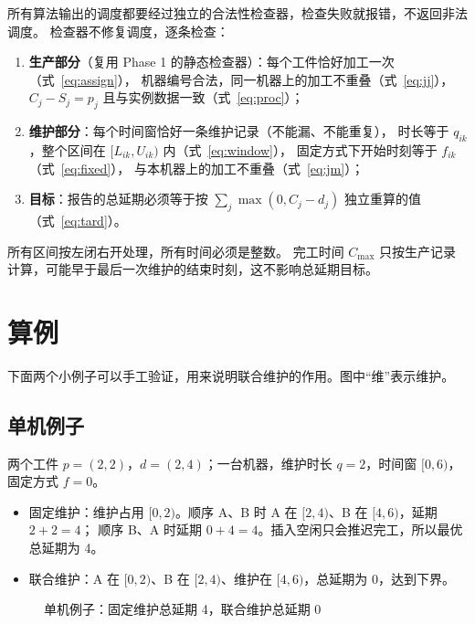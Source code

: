 \documentclass[11pt,oneside,notitlepage]{ctexrep}
\theoremstyle{definition}
\theoremstyle{remark}
\newcommand{\gbar}[5]{%
  \fill[#5] (#2,-#1-0.35) rectangle (#3,-#1+0.35);
  \draw (#2,-#1-0.35) rectangle (#3,-#1+0.35);
  \node[font=\small] at ({(#2+#3)/2},-#1) {#4};}
\newcommand{\gaxis}[2]{%
  \draw[->] (0,-#1-0.55) -- (#2+0.4,-#1-0.55);
  \foreach \t in {0,...,#2} {\draw (\t,-#1-0.55) -- (\t,-#1-0.65); \node[font=\scriptsize,below] at (\t,-#1-0.6) {\t};}}
\begin{document}
所有算法输出的调度都要经过独立的合法性检查器，检查失败就报错，不返回非法调度。
检查器不修复调度，逐条检查：
\begin{enumerate}[nosep]
  \item \textbf{生产部分}（复用 Phase 1 的静态检查器）：每个工件恰好加工一次（式~\eqref{eq:assign}），
        机器编号合法，同一机器上的加工不重叠（式~\eqref{eq:jj}），
        $C_j-S_j=p_j$ 且与实例数据一致（式~\eqref{eq:proc}）；
  \item \textbf{维护部分}：每个时间窗恰好一条维护记录（不能漏、不能重复），
        时长等于 $q_{ik}$，整个区间在 $[L_{ik},U_{ik})$ 内（式~\eqref{eq:window}），
        固定方式下开始时刻等于 $f_{ik}$（式~\eqref{eq:fixed}），
        与本机器上的加工不重叠（式~\eqref{eq:jm}）；
  \item \textbf{目标}：报告的总延期必须等于按 $\sum_j\max(0,C_j-d_j)$ 独立重算的值（式~\eqref{eq:tard}）。
\end{enumerate}
所有区间按左闭右开处理，所有时间必须是整数。
完工时间 $C_{\max}$ 只按生产记录计算，可能早于最后一次维护的结束时刻，这不影响总延期目标。

\section{算例}

下面两个小例子可以手工验证，用来说明联合维护的作用。图中“维”表示维护。

\subsection{单机例子}

两个工件 $p=(2,2)$，$d=(2,4)$；一台机器，维护时长 $q=2$，时间窗 $[0,6)$，固定方式 $f=0$。
\begin{itemize}[nosep]
  \item 固定维护：维护占用 $[0,2)$。顺序 A、B 时 A 在 $[2,4)$、B 在 $[4,6)$，延期 $2+2=4$；
        顺序 B、A 时延期 $0+4=4$。插入空闲只会推迟完工，所以最优总延期为 4。
  \item 联合维护：A 在 $[0,2)$、B 在 $[2,4)$、维护在 $[4,6)$，总延期为 0，达到下界。
\end{itemize}

\begin{figure}[h]
\centering
{}
\caption{单机例子：固定维护总延期 4，联合维护总延期 0}
\end{figure}
\end{document}
